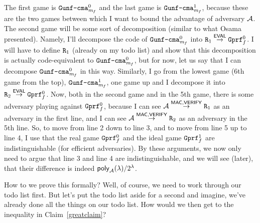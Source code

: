 \documentclass[a4paper,table,dvipsnames]{article}
\theoremstyle{definition}
\newcommand{\M}[1]{\ensuremath{\text{\texttt{#1}}}}
\renewcommand{\O}[1]{\ensuremath{\mathsf{#1}}}
\newcommand{\pcvar}[1]{\ensuremath{\mathit{#1}}}
\newcommand{\m}{\pcvar{m}} %
\begin{document}
The first game is $\M{Gunf\text{-}cma}_{\m_f}^0$
and the last game is $\M{Gunf\text{-}cma}_{\m_f}^1$, because these are the two games between which I want to
bound the advantage of adversary $\mathcal{A}$. The second game will be some sort of decomposition (similar to what Osama presented). Namely, I'll
decompose the code of $\M{Gunf\text{-}cma}_{\m_f}^0$ into $\M{R}_1\stackrel{\O{EVAL}}{\rightarrow}\M{Gprf}^0_f$. I will have to define $\M{R}_1$ (already on my todo list) and show that this decomposition is actually
code-equivalent to $\M{Gunf\text{-}cma}_{\m_f}^0$, but for now, let us say that I can decompose $\M{Gunf\text{-}cma}_{\m_f}^0$ in
this way. Similarly, I go from the lowest game (6th game from the top), $\M{Gunf\text{-}cma}_{\m_f}^1$, one game up and I decompose it into
$\M{R}_2\stackrel{\O{EVAL}}{\rightarrow}\M{Gprf}^0_f$. Now, both in the second game and in the 5th game,
there is some adversary playing against $\M{Gprf}^0_f$, because I can see $\adv\stackrel{\O{MAC},\O{VERIFY}}{\rightarrow}\M{R}_1$ as
an adversary in the first line, and I can see $\adv\stackrel{\O{MAC},\O{VERIFY}}{\rightarrow}\M{R}_2$ as an adversary in the 5th line.
So, to move from line 2 down to line 3, and to move from line 5 up to line 4, I use that the real game $\M{Gprf}^0_f$ and the ideal
game $\M{Gprf}^1_f$ are indistinguishable (for efficient adversaries). By these arguments, we now only need to argue that line 3
and line 4 are indistinguishable, and we will see (later), that their difference is indeed $\O{poly}_\adv(\lambda)/2^\lambda$.

How to we prove this formally? Well, of course, we need to work through our todo list first. But let's put the todo list aside
for a second and imagine, we've already done all the things on our todo list. How would we then get to the inequality
in Claim~\ref{greatclaim}?
\end{document}
